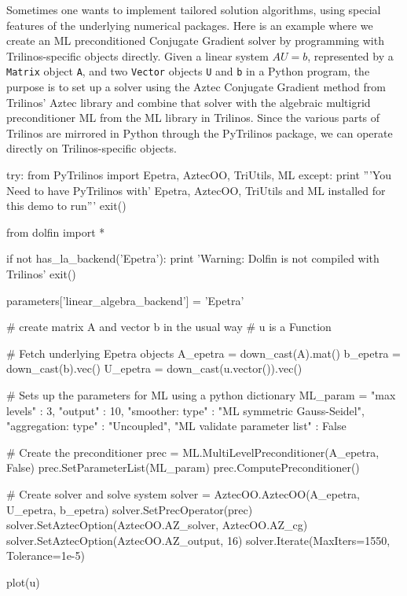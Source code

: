 Sometimes one wants to implement tailored solution algorithms, using
special features of the underlying numerical packages.
Here is an example where we create an ML preconditioned Conjugate
Gradient solver by programming with Trilinos-specific objects directly.
Given a linear system
$AU=b$, represented by a {\fontsize{10pt}{10pt}\texttt{Matrix}} object {\fontsize{10pt}{10pt}\texttt{A}},
and two {\fontsize{10pt}{10pt}\texttt{Vector}} objects {\fontsize{10pt}{10pt}\texttt{U}} and {\fontsize{10pt}{10pt}\texttt{b}} in a
Python program, the purpose is to
set up a solver using the Aztec Conjugate Gradient method from
Trilinos' Aztec library and combine that solver with the 
algebraic multigrid preconditioner ML
from the ML library in Trilinos. Since the various parts of
Trilinos are mirrored in Python through the PyTrilinos package, 
we can operate directly
on Trilinos-specific objects.
\begin{python}
try:
    from PyTrilinos import Epetra, AztecOO, TriUtils, ML
except:
    print '''You Need to have PyTrilinos with'
Epetra, AztecOO, TriUtils and ML installed
for this demo to run'''
    exit()

from dolfin import *

if not has_la_backend('Epetra'):
    print 'Warning: Dolfin is not compiled with Trilinos'
    exit()

parameters['linear_algebra_backend'] = 'Epetra'

# create matrix A and vector b in the usual way
# u is a Function

# Fetch underlying Epetra objects
A_epetra = down_cast(A).mat()
b_epetra = down_cast(b).vec()
U_epetra = down_cast(u.vector()).vec()

# Sets up the parameters for ML using a python dictionary
ML_param = {"max levels"        : 3,
            "output"            : 10,
            "smoother: type"    : "ML symmetric Gauss-Seidel",
            "aggregation: type" : "Uncoupled",
            "ML validate parameter list" : False
}

# Create the preconditioner
prec = ML.MultiLevelPreconditioner(A_epetra, False)
prec.SetParameterList(ML_param)
prec.ComputePreconditioner()

# Create solver and solve system
solver = AztecOO.AztecOO(A_epetra, U_epetra, b_epetra)
solver.SetPrecOperator(prec)
solver.SetAztecOption(AztecOO.AZ_solver, AztecOO.AZ_cg)
solver.SetAztecOption(AztecOO.AZ_output, 16)
solver.Iterate(MaxIters=1550, Tolerance=1e-5)

plot(u)
\end{python}



